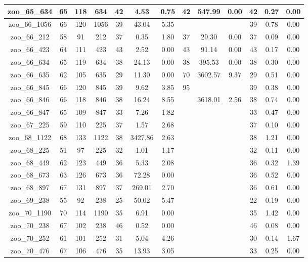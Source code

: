 \begin{landscape}
\begin{longtable}{|c|c|c|c|c|c|c|c|c|c|c|c|c|}
zoo\_65\_634 & 65 & 118 & 634 & 42 & 4.53 & 0.75 & 42 & 547.99 & 0.00 & 42 & 0.27 & 0.00 \\ \hline 
zoo\_66\_1056 & 66 & 120 & 1056 & 39 & 43.04 & 5.35 &  &  &  & 39 & 0.78 & 0.00 \\ \hline 
zoo\_66\_212 & 58 & 91 & 212 & 37 & 0.35 & 1.80 & 37 & 29.30 & 0.00 & 37 & 0.09 & 0.00 \\ \hline 
zoo\_66\_423 & 64 & 111 & 423 & 43 & 2.52 & 0.00 & 43 & 91.14 & 0.00 & 43 & 0.17 & 0.00 \\ \hline 
zoo\_66\_634 & 65 & 119 & 634 & 38 & 24.13 & 0.00 & 38 & 395.53 & 0.00 & 38 & 0.30 & 0.00 \\ \hline 
zoo\_66\_635 & 62 & 105 & 635 & 29 & 11.30 & 0.00 & 70 & 3602.57 & 9.37 & 29 & 0.51 & 0.00 \\ \hline 
zoo\_66\_845 & 66 & 120 & 845 & 39 & 9.62 & 3.85 & 95 &  &  & 39 & 0.38 & 0.00 \\ \hline 
zoo\_66\_846 & 66 & 118 & 846 & 38 & 16.24 & 8.55 &  & 3618.01 & 2.56 & 38 & 0.74 & 0.00 \\ \hline 
zoo\_66\_847 & 65 & 109 & 847 & 33 & 7.26 & 1.82 &  &  &  & 33 & 0.47 & 0.00 \\ \hline 
zoo\_67\_225 & 59 & 110 & 225 & 37 & 1.57 & 2.68 &  &  &  & 37 & 0.10 & 0.00 \\ \hline 
zoo\_68\_1122 & 68 & 133 & 1122 & 38 & 3427.86 & 2.63 &  &  &  & 38 & 1.21 & 0.00 \\ \hline 
zoo\_68\_225 & 51 & 97 & 225 & 32 & 1.01 & 1.17 &  &  &  & 32 & 0.11 & 0.00 \\ \hline 
zoo\_68\_449 & 62 & 123 & 449 & 36 & 5.33 & 2.08 &  &  &  & 36 & 0.32 & 1.39 \\ \hline 
zoo\_68\_673 & 63 & 126 & 673 & 36 & 72.28 & 0.00 &  &  &  & 36 & 0.52 & 0.00 \\ \hline 
zoo\_68\_897 & 67 & 131 & 897 & 37 & 269.01 & 2.70 &  &  &  & 36 & 0.61 & 0.00 \\ \hline 
zoo\_69\_238 & 55 & 92 & 238 & 25 & 50.02 & 5.47 &  &  &  & 22 & 0.19 & 0.00 \\ \hline 
zoo\_70\_1190 & 70 & 114 & 1190 & 35 & 6.91 & 0.00 &  &  &  & 35 & 1.42 & 0.00 \\ \hline 
zoo\_70\_238 & 67 & 102 & 238 & 46 & 0.52 & 0.00 &  &  &  & 46 & 0.08 & 0.00 \\ \hline 
zoo\_70\_252 & 61 & 101 & 252 & 31 & 5.04 & 4.26 &  &  &  & 30 & 0.14 & 1.67 \\ \hline 
zoo\_70\_476 & 67 & 106 & 476 & 35 & 13.93 & 3.05 &  &  &  & 33 & 0.25 & 0.00 \\ \hline 

\end{longtable}
\end{landscape}
